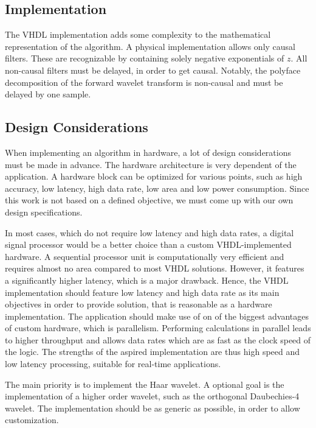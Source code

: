 \begin{refsection}
\section{Implementation}

The VHDL implementation adds some complexity to the mathematical representation of the algorithm.
A physical implementation allows only causal filters.
These are recognizable by containing solely negative exponentials of $z$.
All non-causal filters must be delayed, in order to get causal.
Notably, the polyface decomposition of the forward wavelet transform is non-causal and must be delayed by one sample.

\subsection{Design Considerations}

When implementing an algorithm in hardware, a lot of design considerations must be made in advance.
The hardware architecture is very dependent of the application.
A hardware block can be optimized for various points, such as high accuracy, low latency, high data rate, low area and low power consumption.
Since this work is not based on a defined objective, we must come up with our own design specifications.

In most cases, which do not require low latency and high data rates, a digital signal processor would be a better choice than a custom VHDL-implemented hardware.
A sequential processor unit is computationally very efficient and requires almost no area compared to most VHDL solutions.
However, it features a significantly higher latency, which is a major drawback.
Hence, the VHDL implementation should feature low latency and high data rate as its main objectives in order to provide solution, that is reasonable as a hardware implementation.
The application should make use of on of the biggest advantages of custom hardware, which is parallelism.
Performing calculations in parallel leads to higher throughput and allows data rates which are as fast as the clock speed of the logic.
The strengths of the aspired implementation are thus high speed and low latency processing, suitable for real-time applications.

The main priority is to implement the Haar wavelet.
A optional goal is the implementation of a higher order wavelet, such as the orthogonal Daubechies-4 wavelet.
The implementation should be as generic as possible, in order to allow customization.


\end{refsection}
